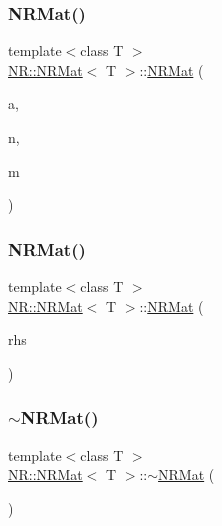 \mbox{\label{classNR_1_1NRMat_a30ddcc485a9e735b1fafbb56022fdc3a}} 
\subsubsection{\texorpdfstring{NRMat()}{NRMat()}\hspace{0.1cm}{\footnotesize\ttfamily [4/10]}}
{\footnotesize\ttfamily template$<$class T $>$ \\
\mbox{\hyperlink{classNR_1_1NRMat}{N\+R\+::\+N\+R\+Mat}}$<$ T $>$\+::\mbox{\hyperlink{classNR_1_1NRMat}{N\+R\+Mat}} (\begin{DoxyParamCaption}\item[{const T $\ast$}]{a,  }\item[{int}]{n,  }\item[{int}]{m }\end{DoxyParamCaption})}

\mbox{\label{classNR_1_1NRMat_a7ad1dc6f56c44d5d0a7b595d48206cfa}} 
\subsubsection{\texorpdfstring{NRMat()}{NRMat()}\hspace{0.1cm}{\footnotesize\ttfamily [5/10]}}
{\footnotesize\ttfamily template$<$class T $>$ \\
\mbox{\hyperlink{classNR_1_1NRMat}{N\+R\+::\+N\+R\+Mat}}$<$ T $>$\+::\mbox{\hyperlink{classNR_1_1NRMat}{N\+R\+Mat}} (\begin{DoxyParamCaption}\item[{const \mbox{\hyperlink{classNR_1_1NRMat}{N\+R\+Mat}}$<$ T $>$ \&}]{rhs }\end{DoxyParamCaption})}

\mbox{\label{classNR_1_1NRMat_a8b6826b7a7556a397ee7d7ad382e5dae}} 
\subsubsection{\texorpdfstring{$\sim$NRMat()}{~NRMat()}\hspace{0.1cm}{\footnotesize\ttfamily [1/2]}}
{\footnotesize\ttfamily template$<$class T $>$ \\
\mbox{\hyperlink{classNR_1_1NRMat}{N\+R\+::\+N\+R\+Mat}}$<$ T $>$\+::$\sim$\mbox{\hyperlink{classNR_1_1NRMat}{N\+R\+Mat}} (\begin{DoxyParamCaption}{ }\end{DoxyParamCaption})}

